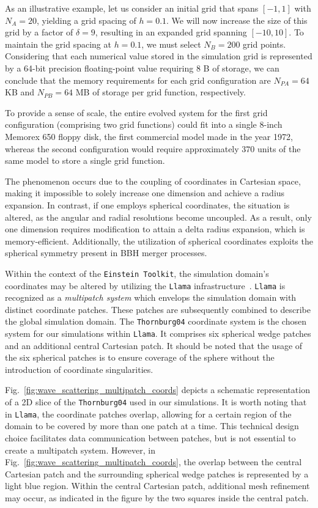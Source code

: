 As an illustrative example, let us consider an initial grid that spans $[-1,1]$ with $N_A=20$, yielding a grid spacing of $h=0.1$. We will now increase the size of this grid by a factor of $\delta=9$, resulting in an expanded grid spanning $[-10,10]$. To maintain the grid spacing at $h=0.1$, we must select $N_B=200$ grid points. Considering that each numerical value stored in the simulation grid is represented by a 64-bit precision floating-point value requiring 8 B of storage, we can conclude that the memory requirements for each grid configuration are $N_{PA}=64$ KB and $N_{PB}=64$ MB of storage per grid function, respectively.

To provide a sense of scale, the entire evolved system for the first grid configuration (comprising two grid functions) could fit into a single 8-inch Memorex 650 floppy disk, the first commercial model made in the year 1972, whereas the second configuration would require approximately $370$ units of the same model to store a single grid function.

The phenomenon occurs due to the coupling of coordinates in Cartesian space, making it impossible to solely increase one dimension and achieve a radius expansion. In contrast, if one employs spherical coordinates, the situation is altered, as the angular and radial resolutions become uncoupled. As a result, only one dimension requires modification to attain a delta radius expansion, which is memory-efficient. Additionally, the utilization of spherical coordinates exploits the spherical symmetry present in \ac{BBH} merger processes.

Within the context of the \texttt{Einstein Toolkit}, the simulation domain's coordinates may be altered by utilizing the \texttt{Llama} infrastructure~\cite{Reisswig2010,PhysRevD.83.044045}. \texttt{Llama} is recognized as a \textit{multipatch system} which envelops the simulation domain with distinct coordinate patches. These patches are subsequently combined to describe the global simulation domain. The \texttt{Thornburg04} coordinate system is the chosen system for our simulations within \texttt{Llama}. It comprises six spherical wedge patches and an additional central Cartesian patch. It should be noted that the usage of the six spherical patches is to ensure coverage of the sphere without the introduction of coordinate singularities.

Fig.~\ref{fig:wave_scattering_multipatch_coords} depicts a schematic representation of a 2D slice of the \texttt{Thornburg04} used in our simulations. It is worth noting that in \texttt{Llama}, the coordinate patches overlap, allowing for a certain region of the domain to be covered by more than one patch at a time. This technical design choice facilitates data communication between patches, but is not essential to create a multipatch system. However, in Fig.~\ref{fig:wave_scattering_multipatch_coords}, the overlap between the central Cartesian patch and the surrounding spherical wedge patches is represented by a light blue region. Within the central Cartesian patch, additional mesh refinement may occur, as indicated in the figure by the two squares inside the central patch.

